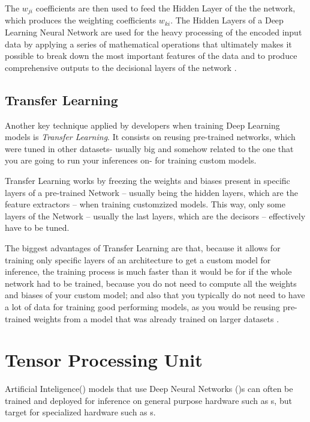 \documentclass[openright]{normas-utf-tex} %
\begin{document}
The $w_{ji}$ coefficients are then used to feed the Hidden Layer of the the network,
which produces the weighting coefficients $w_{ki}$. The Hidden Layers of a Deep Learning 
Neural Network are used for the heavy processing of the encoded input data by applying a series of 
mathematical operations that ultimately makes it possible to break down the most important features
of the data and to produce comprehensive outputs to the decisional layers of the network
\cite{DeepAI_HiddenLayer}.

\subsection{Transfer Learning}

Another key technique applied by developers when training Deep Learning models is
\textit{Transfer Learning}. 
It consists on reusing pre-trained networks, which were tuned in other datasets- usually big and
somehow related to the one that you are going to run your inferences on- for training custom models.

Transfer Learning works by freezing the weights and biases present in specific layers of a
pre-trained Network -- usually being the hidden layers, which are the feature extractors -- 
when training customzized models. This way,  only some layers of the Network -- usually the last layers, which 
are the decisors -- effectively have to be tuned.

The biggest advantages of Transfer Learning are that, because it allows for
training only specific layers of an architecture to get a custom model for
inference, the training process is much faster than it would be for if the
whole network had to be trained, because you do not need to compute all the
weights and biases of your custom model; and also that you typically do not
need to have a lot of data for training good performing models, as you
would be reusing pre-trained weights from a model that was already trained on
larger datasets \cite{CS231N}.

\section{Tensor Processing Unit}

Artificial Inteligence() models that use Deep Neural 
Networks ()s can often be trained and deployed for inference
on general purpose hardware such as s, but target 
for specialized hardware such as s.
\end{document}
